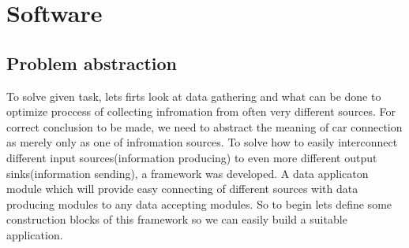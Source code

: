\section{Software} %
\label{sec:software}
\subsection{Problem abstraction} %
\label{sub:problem_abstraction}
To solve given task, lets firts look at data gathering and what can be done to optimize proccess of collecting infromation from often very different sources. For correct conclusion to be made, we need to abstract the meaning of car connection as merely only as one of infromation sources. To solve how to easily interconnect different input sources(information producing) to even more different output sinks(information sending), a framework was developed. A data applicaton module which will provide easy connecting of different sources with data producing modules to any data accepting modules. So to begin lets define some construction blocks of this framework so we can easily build a suitable application.
